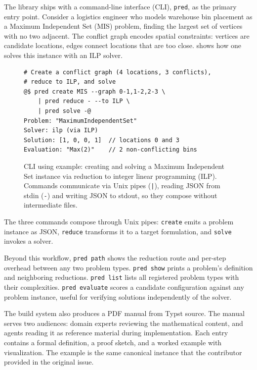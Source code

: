 \documentclass[conference]{IEEEtran}
\begin{document}
The library ships with a command-line interface (CLI), \texttt{pred}, as the primary entry point.
Consider a logistics engineer who models warehouse bin placement as a Maximum Independent Set (MIS) problem, finding the largest set of vertices with no two adjacent.
The conflict graph encodes spatial constraints: vertices are candidate locations, edges connect locations that are too close.
 shows how one solves this instance with an ILP solver.
\begin{figure}[t]
\begin{lstlisting}
# Create a conflict graph (4 locations, 3 conflicts),
# reduce to ILP, and solve
@$ pred create MIS --graph 0-1,1-2,2-3 \
    | pred reduce - --to ILP \
    | pred solve -@
Problem: "MaximumIndependentSet"
Solver: ilp (via ILP)
Solution: [1, 0, 0, 1]  // locations 0 and 3
Evaluation: "Max(2)"    // 2 non-conflicting bins
\end{lstlisting}
\caption{CLI using example: creating and solving a Maximum Independent Set instance via reduction to integer linear programming (ILP).
  Commands communicate via Unix pipes (\texttt{|}), reading JSON from stdin (\texttt{-}) and writing JSON to stdout, so they compose without intermediate files.}
\label{lst:cli-session}
\end{figure}
The three commands compose through Unix pipes: \texttt{create} emits a problem instance as JSON, \texttt{reduce} transforms it to a target formulation, and \texttt{solve} invokes a solver.

Beyond this workflow, \texttt{pred path} shows the reduction route and per-step overhead between any two problem types.
\texttt{pred show} prints a problem's definition and neighboring reductions.
\texttt{pred list} lists all registered problem types with their complexities.
\texttt{pred evaluate} scores a candidate configuration against any problem instance, useful for verifying solutions independently of the solver.

The build system also produces a PDF manual from Typst source.
The manual serves two audiences: domain experts reviewing the mathematical content, and agents reading it as reference material during implementation.
Each entry contains a formal definition, a proof sketch, and a worked example with visualization.
The example is the same canonical instance that the contributor provided in the original issue.
\end{document}

